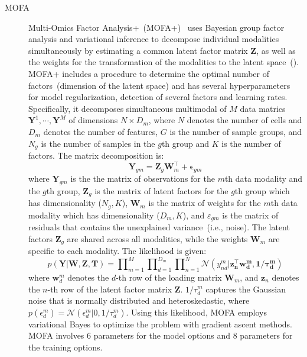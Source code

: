 \begin{description}
  \item[MOFA]
  Multi-Omics Factor Analysis+~(MOFA+)~\citep{argelaguet2020mofa+} uses Bayesian group factor analysis and variational inference to decompose individual modalities simultaneously by estimating a common latent factor matrix $\mathbf{Z}$, as well as the weights for the transformation of the modalities to the latent space~(). MOFA+ includes a procedure to determine the optimal number of factors~(dimension of the latent space) and has several hyperparameters for model regularization, detection of several factors and learning rates. Specifically, it decomposes simultaneous multimodal of $M$ data matrics $\mathbf{Y}^1, \cdots, \mathbf{Y}^M$ of dimensions $N\times D_m$, where $N$ denotes the number of cells and $D_m$ denotes the number of features, $G$ is the number of sample groups, and $N_g$ is the number of samples in the $g$th group and $K$ is the number of factors. The matrix decomposition is:
  \begin{equation}
  \textbf{Y}_{gm} = \textbf{Z}_g\textbf{W}_m^{\top} + \bm{\epsilon}_{gm}
  \end{equation}
  where $\mathbf{Y}_{gm}$ is the the matrix of observations for the $m$th data modality and the $g$th group, $\mathbf{Z}_g$ is the matrix of latent factors for the $g$th group which has dimensionality ($N_g,K$), $\mathbf{W}_m$ is the matrix of weights for the $m$th data modality which has dimensionality ($D_m,K$), and $\varepsilon_{gm}$ is the matrix of residuals that contains the unexplained variance~(i.e., noise). The latent factors $\mathbf{Z}_g$ are shared across all modalities, while the weights $\mathbf{W}_m$ are specific to each modality. The likelihood is given:
\begin{equation}
    p(\mathbf{Y|\mathbf{W},\mathbf{Z},\mathbf{T}}) = \mathbf{\prod}_{m=1}^{M}\mathbf{\prod}_{d=1}^{D_m}\mathbf{\prod}_{n=1}^{N} \mathcal{N}(y_{nd}^m|\mathbf{z_n^\top \mathbf{w}_d^m, 1/\tau_d^m})
\end{equation}
    where $\mathbf{w}_d^m$ denotes the $d$-th row of the loading matrix $\mathbf{W}_m$, and $\mathbf{z}_n$ denotes the $n$-th row of the latent factor matrix $\mathbf{Z}$. $1/\tau_d^m$ captures the Gaussian noise that is normally distributed and heteroskedastic, where $p(\epsilon_d^m) = \mathcal{N}(\epsilon_d^m| 0, 1/\tau_d^m)$. Using this likelihood, MOFA employs variational Bayes to optimize the problem with gradient ascent methods. MOFA involves 6 parameters for the model options and 8 parameters for the training options.



\end{description}
